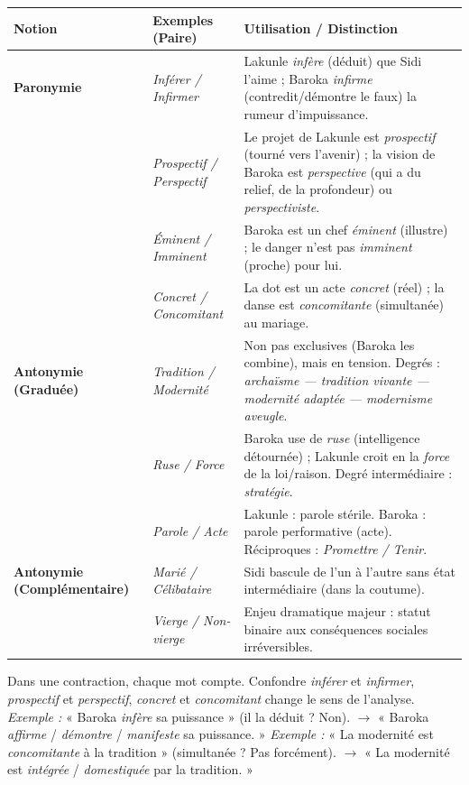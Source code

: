 \documentclass[11pt]{article}
\begin{document}
\begin{exemplebox}
\begin{center}
\begin{tabularx}{\linewidth}{|l|X|X|}\hline
\rowcolor{popblueL}
\textbf{Notion} & \textbf{Exemples (Paire)} & \textbf{Utilisation / Distinction} \\ \hline
\textbf{Paronymie} & \emph{Inférer / Infirmer} & Lakunle \emph{infère} (déduit) que Sidi l'aime ; Baroka \emph{infirme} (contredit/démontre le faux) la rumeur d'impuissance. \\
& \emph{Prospectif / Perspectif} & Le projet de Lakunle est \emph{prospectif} (tourné vers l'avenir) ; la vision de Baroka est \emph{perspective} (qui a du relief, de la profondeur) ou \emph{perspectiviste}. \\
& \emph{Éminent / Imminent} & Baroka est un chef \emph{éminent} (illustre) ; le danger n'est pas \emph{imminent} (proche) pour lui. \\
& \emph{Concret / Concomitant} & La dot est un acte \emph{concret} (réel) ; la danse est \emph{concomitante} (simultanée) au mariage. \\ \hline
\textbf{Antonymie (Graduée)} & \emph{Tradition / Modernité} & Non pas exclusives (Baroka les combine), mais en tension. Degrés : \emph{archaïsme — tradition vivante — modernité adaptée — modernisme aveugle}. \\
& \emph{Ruse / Force} & Baroka use de \emph{ruse} (intelligence détournée) ; Lakunle croit en la \emph{force} de la loi/raison. Degré intermédiaire : \emph{stratégie}. \\
& \emph{Parole / Acte} & Lakunle : parole stérile. Baroka : parole performative (acte). Réciproques : \emph{Promettre / Tenir}. \\ \hline
\textbf{Antonymie (Complémentaire)} & \emph{Marié / Célibataire} & Sidi bascule de l'un à l'autre sans état intermédiaire (dans la coutume). \\
& \emph{Vierge / Non-vierge} & Enjeu dramatique majeur : statut binaire aux conséquences sociales irréversibles. \\ \hline
\end{tabularx}
\end{center}
\end{exemplebox}

\begin{attention}
Dans une contraction, chaque mot compte. Confondre \emph{inférer} et \emph{infirmer}, \emph{prospectif} et \emph{perspectif}, \emph{concret} et \emph{concomitant} change le sens de l'analyse.
\emph{Exemple :} « Baroka \emph{infère} sa puissance » (il la déduit ? Non). $\rightarrow$ « Baroka \emph{affirme} / \emph{démontre} / \emph{manifeste} sa puissance. »
\emph{Exemple :} « La modernité est \emph{concomitante} à la tradition » (simultanée ? Pas forcément). $\rightarrow$ « La modernité est \emph{intégrée} / \emph{domestiquée} par la tradition. »
\end{attention}
\end{document}
